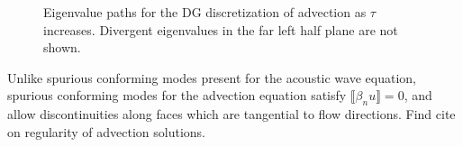 \documentclass[10pt]{article}
\newcommand{\jump}[1] {\ensuremath{\llbracket#1\rrbracket}}
\newcommand{\note}[1]{{\color{blue}#1}}
\begin{document}
\begin{figure}
\centering
{}
\hspace{.5em}
\caption{Eigenvalue paths for the DG discretization of advection as $\tau$ increases.  Divergent eigenvalues in the far left half plane are not shown.  }
\label{fig:trackModesAdvec}
\end{figure}

Unlike spurious conforming modes present for the acoustic wave equation, spurious conforming modes for the advection equation satisfy $\jump{\beta_n u} = 0$, and allow discontinuities along faces which are tangential to flow directions.  \note{Find cite on regularity of advection solutions.} 
\end{document}
